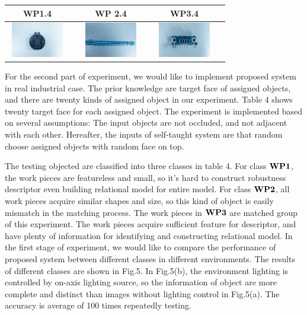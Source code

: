 \documentclass[journal]{IEEEtran}
\begin{document}
\begin{table}[!t]
\begin{center}
\begin{tabular}{|c|c||c|c||c|c|}
\hline
WP1.4 & & WP 2.4 & & WP3.4 &\\
\hline
\includegraphics[width=1in,height=0.6in]{j_img/wp14.jpg} & 
 & 
\includegraphics[width=1in,height=0.6in]{j_img/wp24.jpg} & 
 &
\includegraphics[width=1in,height=0.6in]{j_img/wp34.jpg} & 
\\ 
\hline
\end{tabular}
\end{center}
\end{table}

For the second part of experiment, we would like to implement proposed system in real industrial case. The prior knowledge are target face of assigned objects, and there are twenty kinds of assigned object in our experiment. Table 4 shows twenty target face for each assigned object. The experiment is implemented based on several assumptions: The input objects are not occluded, and not adjacent with each other. Hereafter, the inputs of self-taught system are that random choose assigned objects with random face on top. 

The testing objected are classified into three classes in table 4. For class $\bf{WP1}$, the work pieces are featureless and small, so it's hard to construct robustness descriptor even building relational model for entire model. For class $\bf{WP2}$, all work pieces acquire similar shapes and size, so this kind of object is easily mismatch in the matching process. The work pieces in $\bf{WP3}$ are matched group of this experiment. The work pieces acquire sufficient feature for descriptor, and have plenty of information for identifying and constructing relational model. In the first stage of experiment, we would like to compare the performance of proposed system between different classes in different environments.  The results of different classes are shown in Fig.5. In Fig.5(b), the environment lighting is controlled by on-axis lighting source, so the information of object are more complete and distinct than images without lighting control in Fig.5(a). The accuracy is average of 100 times repeatedly testing.
\end{document}
